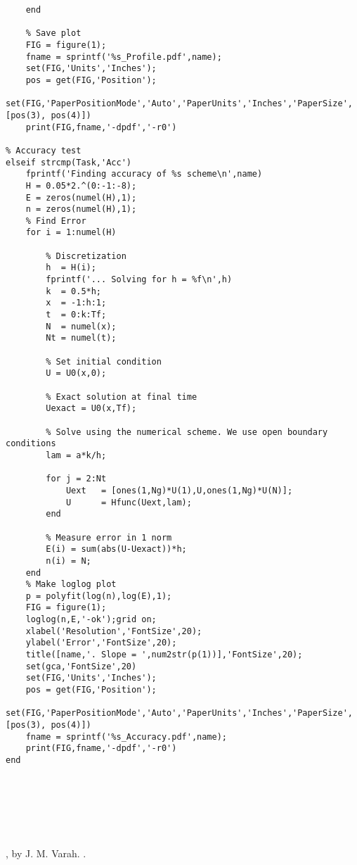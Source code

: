 \documentclass{article}
\begin{document}
\begin{exerciseList}
\begin{lstlisting}
    end
    
    % Save plot
    FIG = figure(1);
    fname = sprintf('%s_Profile.pdf',name);
    set(FIG,'Units','Inches');
    pos = get(FIG,'Position');
    set(FIG,'PaperPositionMode','Auto','PaperUnits','Inches','PaperSize',[pos(3), pos(4)])
    print(FIG,fname,'-dpdf','-r0')
    
% Accuracy test
elseif strcmp(Task,'Acc')
    fprintf('Finding accuracy of %s scheme\n',name)
    H = 0.05*2.^(0:-1:-8);
    E = zeros(numel(H),1);
    n = zeros(numel(H),1);
    % Find Error
    for i = 1:numel(H)
        
        % Discretization
        h  = H(i);
        fprintf('... Solving for h = %f\n',h)
        k  = 0.5*h;
        x  = -1:h:1;
        t  = 0:k:Tf;
        N  = numel(x);
        Nt = numel(t);
        
        % Set initial condition
        U = U0(x,0);
        
        % Exact solution at final time
        Uexact = U0(x,Tf);
        
        % Solve using the numerical scheme. We use open boundary conditions
        lam = a*k/h;
        
        for j = 2:Nt
            Uext   = [ones(1,Ng)*U(1),U,ones(1,Ng)*U(N)];
            U      = Hfunc(Uext,lam);
        end
        
        % Measure error in 1 norm
        E(i) = sum(abs(U-Uexact))*h;
        n(i) = N;
    end
    % Make loglog plot
    p = polyfit(log(n),log(E),1);
    FIG = figure(1);
    loglog(n,E,'-ok');grid on;
    xlabel('Resolution','FontSize',20);
    ylabel('Error','FontSize',20);
    title([name,'. Slope = ',num2str(p(1))],'FontSize',20);
    set(gca,'FontSize',20)
    set(FIG,'Units','Inches');
    pos = get(FIG,'Position');
    set(FIG,'PaperPositionMode','Auto','PaperUnits','Inches','PaperSize',[pos(3), pos(4)])
    fname = sprintf('%s_Accuracy.pdf',name);
    print(FIG,fname,'-dpdf','-r0')
end







\end{lstlisting}

\end{exerciseList}
\begin{thebibliography}{99}

, by J. M. Varah.
.
 
\end{thebibliography}
\end{document}
